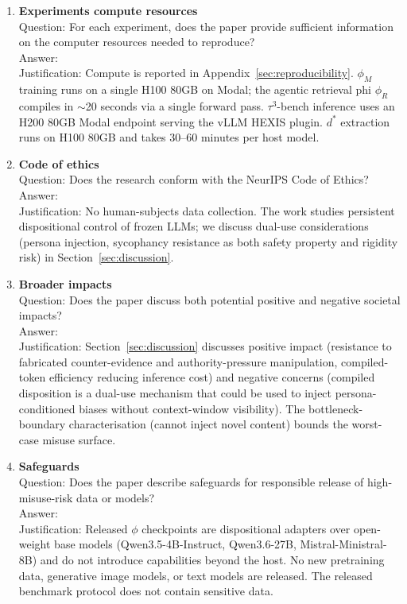 \begin{enumerate}
\item {\bf Experiments compute resources}\\
    Question: For each experiment, does the paper provide sufficient
    information on the computer resources needed to reproduce?\\
    Answer: \answerYes{}\\
    Justification: Compute is reported in Appendix~\ref{sec:reproducibility}.
    $\phi_M$ training runs on a single H100 80GB on Modal; the agentic
    retrieval phi $\phi_R$ compiles in $\sim$20 seconds via a single forward
    pass. $\tau^3$-bench inference uses an H200 80GB Modal endpoint serving
    the vLLM HEXIS plugin. $d^*$ extraction runs on H100 80GB and takes
    30--60 minutes per host model.

\item {\bf Code of ethics}\\
    Question: Does the research conform with the NeurIPS Code of Ethics?\\
    Answer: \answerYes{}\\
    Justification: No human-subjects data collection. The work studies
    persistent dispositional control of frozen LLMs; we discuss dual-use
    considerations (persona injection, sycophancy resistance as both
    safety property and rigidity risk) in Section~\ref{sec:discussion}.

\item {\bf Broader impacts}\\
    Question: Does the paper discuss both potential positive and negative
    societal impacts?\\
    Answer: \answerYes{}\\
    Justification: Section~\ref{sec:discussion} discusses positive impact
    (resistance to fabricated counter-evidence and authority-pressure
    manipulation, compiled-token efficiency reducing inference cost) and
    negative concerns (compiled disposition is a dual-use mechanism that
    could be used to inject persona-conditioned biases without context-window
    visibility). The bottleneck-boundary characterisation (cannot inject
    novel content) bounds the worst-case misuse surface.

\item {\bf Safeguards}\\
    Question: Does the paper describe safeguards for responsible release of
    high-misuse-risk data or models?\\
    Answer: \answerNA{}\\
    Justification: Released $\phi$ checkpoints are dispositional adapters
    over open-weight base models (Qwen3.5-4B-Instruct, Qwen3.6-27B,
    Mistral-Ministral-8B) and do not introduce capabilities beyond the host.
    No new pretraining data, generative image models, or text models are
    released. The released benchmark protocol does not contain
    sensitive data.


\end{enumerate}
